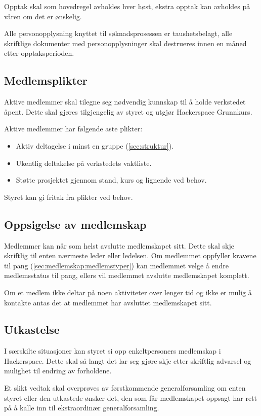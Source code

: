 Opptak skal som hovedregel avholdes hver høst, ekstra opptak kan avholdes på våren om det er ønskelig.
 
Alle personopplysning knyttet til søknadsprosessen er taushetsbelagt, alle skriftlige dokumenter med personopplysninger skal destrueres innen en måned etter opptaksperioden.

\subsection{Medlemsplikter}\label{sec:medlemskap:medlemsplikter}
Aktive medlemmer skal tilegne seg nødvendig kunnskap til å holde verkstedet åpent.
Dette skal gjøres tilgjengelig av styret og utgjør Hackerspace Grunnkurs.

Aktive medlemmer har følgende aste plikter:
\begin{itemize}
\item Aktiv deltagelse i minst en gruppe (\ref{sec:struktur}).
\item Ukentlig deltakelse på verkstedets vaktliste.
\item Støtte prosjektet gjennom stand, kurs og lignende ved behov.
\end{itemize}
Styret kan gi fritak fra plikter ved behov.
        
\subsection{Oppsigelse av medlemskap}\label{sec:medlemskap:oppsigelse}
Medlemmer kan når som helst avslutte medlemskapet sitt.
Dette skal skje skriftlig til enten nærmeste leder eller ledelsen.
Om medlemmet oppfyller kravene til pang (\ref{sec:medlemskap:medlemstyper}) kan medlemmet velge å endre medlemsstatus til pang, ellers vil medlemmet avslutte medlemskapet komplett.

Om et medlem ikke deltar på noen aktiviteter over lenger tid og ikke er mulig å kontakte antas det at medlemmet har avsluttet medlemskapet sitt.

\subsection{Utkastelse}\label{sec:medlemskap:utkastelse}
I særskilte situasjoner kan styret si opp enkeltpersoners medlemskap i Hackerspace.
Dette skal så langt det lar seg gjøre skje etter skriftlig advarsel og mulighet til endring av forholdene.

Et slikt vedtak skal overprøves av førstkommende generalforsamling om enten styret eller den utkastede ønsker det, den som får medlemskapet oppsagt har rett på å kalle inn til ekstraordinær generalforsamling.


